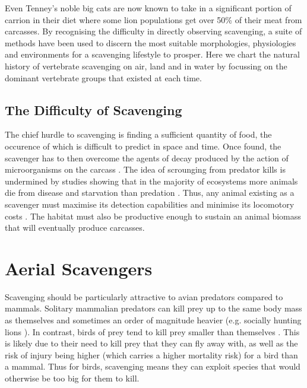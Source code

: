 \documentclass[a4paper,12pt]{article}
\begin{document}
Even Tenney’s noble big cats are now known to take in a significant portion of carrion in their diet where some lion populations get over 50\% of their meat from carcasses.
By recognising the difficulty in directly observing scavenging, a suite of methods have been used to discern the most suitable morphologies, physiologies and environments for a scavenging lifestyle to prosper.
Here we chart the natural history of vertebrate scavenging on air, land and in water by focussing on the dominant vertebrate groups that existed at each time.

\subsection*{The Difficulty of Scavenging} %
The chief hurdle to scavenging is finding a sufficient quantity of food, the occurence of which is difficult to predict in space and time.
Once found, the scavenger has to then overcome the agents of decay produced by the action of microorganisms on the carcass \citep{ruxton2014fruit}.
The idea of scrounging from predator kills is undermined by studies showing that in the  majority of ecosystems more animals die from disease and starvation than predation \citep{benbow2015introduction}.
Thus, any animal existing as a scavenger must maximise its detection capabilities and minimise its locomotory costs \citep{ruxton2004obligate}.
The habitat must also be productive enough to sustain an animal biomass that will eventually produce carcasses.


\section*{Aerial Scavengers}
Scavenging should be particularly attractive to avian predators compared to mammals.
Solitary mammalian predators can kill prey up to the same body mass as themselves and sometimes an order of magnitude heavier (e.g. socially hunting lions \citep{owen2008predator}).
In contrast, birds of prey tend to kill prey smaller than themselves \citep{slagsvold2007prey}.
This is likely due to their need to kill prey that they can fly away with, as well as the risk of injury being higher (which carries a higher mortality risk) for a bird than a mammal.
Thus for birds, scavenging means they can exploit species that would otherwise be too big for them to kill.
\end{document}

